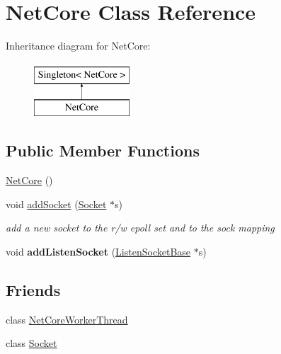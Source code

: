 \hypertarget{classNetCore}{
\section{NetCore Class Reference}
\label{classNetCore}
}
Inheritance diagram for NetCore:\begin{figure}[H]
\begin{center}
\leavevmode
\includegraphics[height=2.000000cm]{classNetCore}
\end{center}
\end{figure}
\subsection*{Public Member Functions}
\begin{DoxyCompactItemize}
\item 
\hyperlink{classNetCore_ad10840be05aa99314c59ca10f067b2da}{NetCore} ()
\item 
void \hyperlink{classNetCore_a427f3577c790d9199e9e976172e32ea3}{addSocket} (\hyperlink{classSocket}{Socket} $\ast$s)
\begin{DoxyCompactList}\small\item\em add a new socket to the r/w epoll set and to the sock mapping \item\end{DoxyCompactList}\item 
\hypertarget{classNetCore_a017906522bcb380b937d3f6dfc780184}{
void {\bfseries addListenSocket} (\hyperlink{classListenSocketBase}{ListenSocketBase} $\ast$s)}
\label{classNetCore_a017906522bcb380b937d3f6dfc780184}

\end{DoxyCompactItemize}
\subsection*{Friends}
\begin{DoxyCompactItemize}
\item 
\hypertarget{classNetCore_ae0585299ab7c2a563b1aeabf73ea2c21}{
class \hyperlink{classNetCore_ae0585299ab7c2a563b1aeabf73ea2c21}{NetCoreWorkerThread}}
\label{classNetCore_ae0585299ab7c2a563b1aeabf73ea2c21}

\item 
\hypertarget{classNetCore_ab510887d735ee73ab1cb598c66260e87}{
class \hyperlink{classNetCore_ab510887d735ee73ab1cb598c66260e87}{Socket}}
\label{classNetCore_ab510887d735ee73ab1cb598c66260e87}

\end{DoxyCompactItemize}


